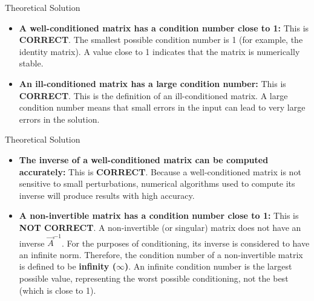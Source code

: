 \documentclass{beamer}
\begin{document}
\begin{frame}{Theoretical Solution}
\begin{itemize}
    \item[\textbf{1)}] \textbf{A well-conditioned matrix has a condition number close to 1:} This is \textbf{CORRECT}. The smallest possible condition number is 1 (for example, the identity matrix). A value close to 1 indicates that the matrix is numerically stable.\\

    \item[\textbf{2)}] \textbf{An ill-conditioned matrix has a large condition number:} This is \textbf{CORRECT}. This is the definition of an ill-conditioned matrix. A large condition number means that small errors in the input can lead to very large errors in the solution.\\

\end{itemize}

\end{frame}

\begin{frame}{Theoretical Solution}
\begin{itemize}
    \item[\textbf{3)}] \textbf{The inverse of a well-conditioned matrix can be computed accurately:} This is \textbf{CORRECT}. Because a well-conditioned matrix is not sensitive to small perturbations, numerical algorithms used to compute its inverse will produce results with high accuracy.\\

    \item[\textbf{4)}] \textbf{A non-invertible matrix has a condition number close to 1:} This is \textbf{NOT CORRECT}. A non-invertible (or singular) matrix does not have an inverse $\vec{A}^{-1}$. For the purposes of conditioning, its inverse is considered to have an infinite norm. Therefore, the condition number of a non-invertible matrix is defined to be \textbf{infinity ($\infty$)}. An infinite condition number is the largest possible value, representing the worst possible conditioning, not the best (which is close to 1).
\end{itemize}

\end{frame}
\end{document}
